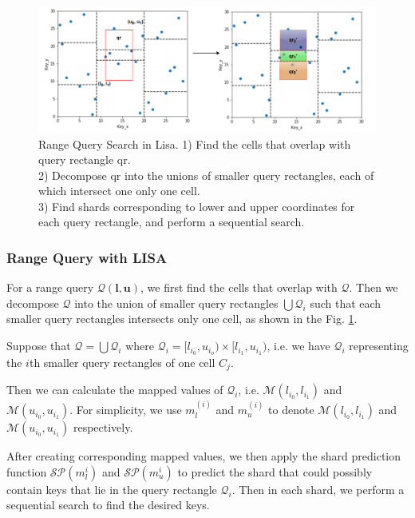 \begin{figure}[t]
    \centering
    \includegraphics[width=1\textwidth]{graphs/range_query_lisa.png}
    \caption{Range Query Search in Lisa.
    1) Find the cells that overlap with query rectangle qr. \\
    2) Decompose qr into the unions of smaller query rectangles, each of which intersect one only one cell. \\
    3) Find shards corresponding to lower and upper coordinates for each query rectangle, and perform a sequential search. }
    \label{fig:Range_Query_Lisa}
\end{figure}


\subsubsection{Range Query with LISA}


For a range query $\mathcal{Q}(\boldsymbol{l},\boldsymbol{u})$, we first find the cells that overlap with $\mathcal{Q}$. Then we decompose $\mathcal{Q}$ into the union of smaller query rectangles $\bigcup \mathcal{Q}_i$ such that each smaller query rectangles intersects only one cell, as shown in the Fig. \ref{fig:Range_Query_Lisa}.



 Suppose that $\mathcal{Q}=\bigcup \mathcal{Q}_i$ where $\mathcal{Q}_i=[l_{i_0}, u_{i_o})\times [l_{i_1}, u_{i_1})$, i.e. we have $\mathcal{Q}_i$ representing the $i$th smaller query rectangles of one cell $C_j$.
 
 Then we can calculate the mapped values of $\mathcal{Q}_i$, i.e. $\mathcal{M}(l_{i_0}, l_{i_1})$ and $\mathcal{M}(u_{i_0}, u_{i_1})$. For simplicity, we use $m_l^{(i)}$ and $m_u^{(i)}$ to denote $\mathcal{M}(l_{i_0}, l_{i_1})$ and $\mathcal{M}(u_{i_0}, u_{i_1})$ respectively.
 
After creating corresponding mapped values, we then apply the shard prediction function $\mathcal{SP}(m_{l}^{i})$ and $\mathcal{SP}(m_{u}^{i})$ to predict the shard that could possibly contain keys that lie in the query rectangle $\mathcal{Q}_i$. Then in each shard, we perform a sequential search to find the desired keys. 

